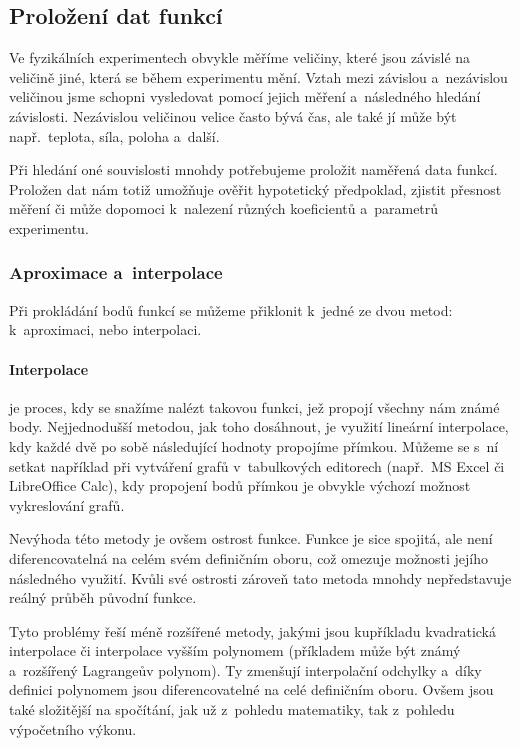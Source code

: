 \subsection{Proložení dat funkcí}
Ve fyzikálních experimentech obvykle měříme veličiny, které jsou závislé na
veličině jiné, která se během experimentu mění. Vztah mezi závislou
a~nezávislou veličinou jsme schopni vysledovat pomocí jejich měření a~následného
hledání závislosti.  Nezávislou veličinou velice často bývá čas, ale také jí
může být např.~teplota, síla, poloha a~další.~\cite{praktikum}
 
Při hledání oné souvislosti mnohdy potřebujeme proložit naměřená data funkcí.
Proložen dat nám totiž umožňuje ověřit hypotetický předpoklad, zjistit přesnost
měření či může dopomoci k~nalezení různých koeficientů a~parametrů experimentu.

\subsubsection{Aproximace a~interpolace}
Při prokládání bodů funkcí se můžeme přiklonit k~jedné ze dvou metod:
k~aproximaci, nebo interpolaci.

\paragraph{Interpolace} je proces, kdy se snažíme nalézt takovou funkci, jež
propojí všechny nám známé body. Nejjednodušší metodou, jak toho dosáhnout, je
využití lineární interpolace, kdy každé dvě po sobě následující hodnoty
propojíme přímkou. Můžeme se s~ní setkat například při vytváření grafů
v~tabulkových editorech (např.~MS Excel či LibreOffice Calc), kdy propojení
bodů přímkou je obvykle výchozí možnost vykreslování grafů. 

Nevýhoda této metody je ovšem ostrost funkce. Funkce je sice spojitá, ale není
diferencovatelná na celém svém definičním oboru, což omezuje možnosti jejího
následného využití. Kvůli své ostrosti zároveň tato metoda mnohdy nepředstavuje
reálný průběh původní funkce.~\cite{segeth}

Tyto problémy řeší méně rozšířené metody, jakými jsou kupříkladu kvadratická
interpolace či interpolace vyšším polynomem (příkladem může být známý
a~rozšířený Lagrangeův polynom). Ty zmenšují interpolační odchylky a~díky
definici polynomem jsou diferencovatelné na celé definičním oboru. Ovšem jsou
také složitější na spočítání, jak už z~pohledu matematiky, tak z~pohledu
výpočetního výkonu.

